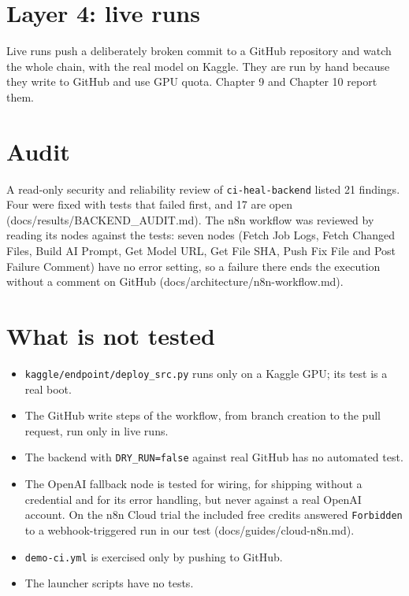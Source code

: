 \documentclass[11pt,a4paper]{report}
\begin{document}
\section{Layer 4: live runs}

Live runs push a deliberately broken commit to a GitHub repository and watch the whole chain, with the real model on Kaggle. They are run by hand because they write to GitHub and use GPU quota. Chapter 9 and Chapter 10 report them.

\section{Audit}

A read-only security and reliability review of \texttt{ci-\allowbreak{}heal-\allowbreak{}backend} listed 21 findings. Four were fixed with tests that failed first, and 17 are open (docs/results/BACKEND\_AUDIT.md). The n8n workflow was reviewed by reading its nodes against the tests: seven nodes (Fetch Job Logs, Fetch Changed Files, Build AI Prompt, Get Model URL, Get File SHA, Push Fix File and Post Failure Comment) have no error setting, so a failure there ends the execution without a comment on GitHub (docs/architecture/n8n-workflow.md).

\section{What is not tested}

\begin{itemize}[leftmargin=*,itemsep=2pt]
\item \texttt{kaggle/\allowbreak{}endpoint/\allowbreak{}deploy\_\allowbreak{}src.\allowbreak{}py} runs only on a Kaggle GPU; its test is a real boot.
\item The GitHub write steps of the workflow, from branch creation to the pull request, run only in live runs.
\item The backend with \texttt{DRY\_\allowbreak{}RUN=false} against real GitHub has no automated test.
\item The OpenAI fallback node is tested for wiring, for shipping without a credential and for its error handling, but never against a real OpenAI account. On the n8n Cloud trial the included free credits answered \texttt{Forbidden} to a webhook-triggered run in our test (docs/guides/cloud-n8n.md).
\item \texttt{demo-\allowbreak{}ci.\allowbreak{}yml} is exercised only by pushing to GitHub.
\item The launcher scripts have no tests.
\end{itemize}
\end{document}
